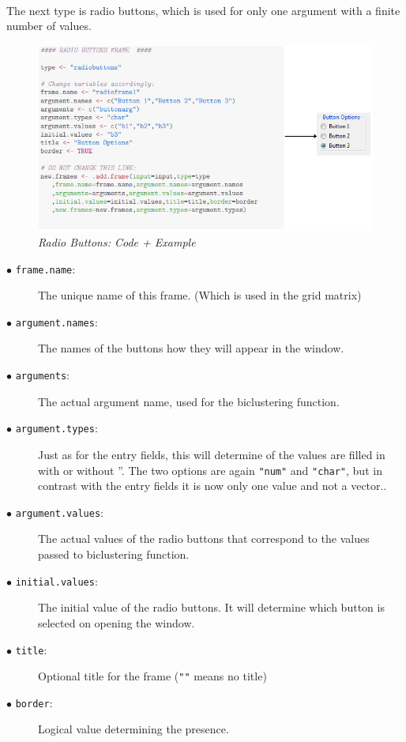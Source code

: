 \documentclass[a4paper]{article}\usepackage[]{graphicx}\usepackage[]{color}
\begin{document}
\\
The next type is radio buttons, which is used for only one argument with a
finite number of values.
\begin{figure}[H]
\centering
\includegraphics[scale=0.5]{figures/radiobuttons.png}
\caption{{\it Radio Buttons: Code + Example}
\label{radiobuttons}}
\end{figure}

\begin{description}
  \item[$\bullet$ \texttt{frame.name}:] The unique name of this frame. (Which is used in the grid matrix)
  \item[$\bullet$ \texttt{argument.names}:] The names of the buttons how they
  will appear in the window.
  \item[$\bullet$ \texttt{arguments}:] The actual argument name, used for the
  biclustering function.
  \item[$\bullet$ \texttt{argument.types}:] Just as for the entry fields, this
  will determine of the values are filled in with or without ''. The two options
  are again \verb|"num"| and \verb|"char"|, but in contrast with the entry
  fields it is now only one value and not a vector..
  \item[$\bullet$ \texttt{argument.values}:] The actual values of the radio buttons 
that correspond to the values passed to biclustering function. 
    \item[$\bullet$ \texttt{initial.values}:] The initial value of the radio
  buttons. It will determine which button is selected on opening the window.
  \item[$\bullet$ \texttt{title}:] Optional title for the frame (\verb|""| means no title)
  \item[$\bullet$ \texttt{border}:] Logical value determining the presence.   

\end{description}
\end{document}
